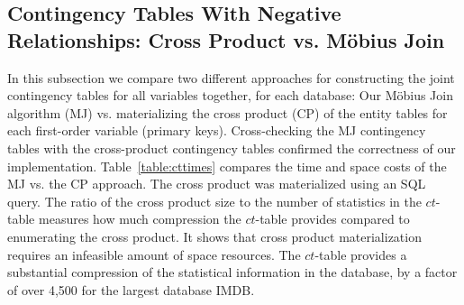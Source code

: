 \documentclass{sig-alternate-2013}
\newcommand{\ct}{\mathit{ct}}
\begin{document}




\subsection{Contingency Tables With Negative Relationships: Cross Product vs. M\"obius Join}


In this subsection we compare two different approaches for constructing the joint contingency tables for all variables together, for each database: Our M\"obius Join algorithm (MJ) vs. materializing the cross product (CP) of the entity tables for each first-order variable (primary keys).
Cross-checking the MJ contingency tables with the cross-product contingency tables confirmed the correctness of our implementation. Table~\ref{table:cttimes} compares the time and space costs of the MJ vs. the CP approach. The cross product was materialized using an SQL query. 
The ratio of the cross product size to the number of statistics in the $\ct$-table measures how much compression the $\ct$-table provides compared to enumerating the cross product. 
It shows that cross product materialization  requires an infeasible amount of space resources.
The $\ct$-table provides a substantial compression of the statistical information in the database, by a factor of over 4,500 for the largest database IMDB.  
\end{document}
